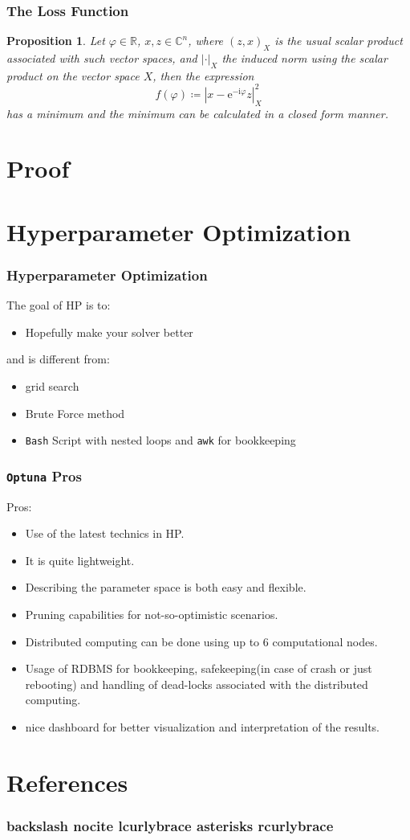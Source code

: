 \documentclass{beamer}
\newtheorem {Prop} [Thm]{Proposition}
\theoremstyle{definition}
\theoremstyle{remark}
\begin{document}
\begin{frame}
\frametitle{The Loss Function}
\begin{Prop}\label{theorem:min distance}
  Let $\varphi \in \mathbb{R}$, $x,z \in \mathbb{C}^n$, where $(z,x)_X$ is 
  the usual scalar product associated with such vector spaces, and $\left|\cdot\right|_X$ the induced norm using the scalar product on the vector space $X$, then the expression
  \begin{equation*}
    f(\varphi) \coloneqq \left|x-\mathrm{e}^{-\mathrm{i}\varphi}z\right|^2_X
  \end{equation*}
  has a minimum and the minimum can be calculated in a closed form manner.
  \end{Prop}
\end{frame}

\section{Proof}

\section[Hyperparameter Optimization]{Hyperparameter Optimization}
\begin{frame}
  \frametitle{Hyperparameter Optimization}
  The goal of \ac{HP} is to:
  \begin{itemize}
    \item Hopefully make your solver better 
  \end{itemize}
  and is different from:
  \begin{itemize}
    \item grid search
    \item Brute Force method
    \item \texttt{Bash} Script with nested loops and \texttt{awk} for bookkeeping
  \end{itemize}
\end{frame}
\begin{frame}
  \frametitle{\texttt{Optuna} Pros}
  Pros:
  \begin{itemize}
    \item Use of the latest technics in \ac{HP}\cite{Hutter2019}\cite{Akiba2019}.
    \item It is quite lightweight.
    \item Describing the parameter space is both easy and flexible.
    \item Pruning capabilities for not-so-optimistic scenarios.
    \item Distributed computing can be done using up to 6 computational nodes.
    \item Usage of \ac{RDBMS} for bookkeeping, safekeeping(in case of crash or just rebooting) and handling of dead-locks associated with the distributed computing.
    \item nice dashboard for better visualization and interpretation of the results.  
  \end{itemize}
\end{frame}



\section[References]{References}
  \begin{frame}[allowframebreaks]
  \frametitle{backslash nocite lcurlybrace asterisks rcurlybrace}
  \nocite{*}
  \printbibliography 
  \end{frame}
\end{document}
